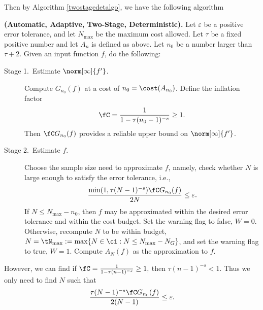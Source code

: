 Then by Algorithm \ref{twostagedetalgo}, we have the following algorithm
\begin{algo} \label{adpatalgo}
{\bf (Automatic, Adaptive, Two-Stage, Deterministic).}
 Let $\varepsilon$ be a positive error tolerance, and let $N_{\max}$ be the maximum cost allowed.  Let $\tau$ be a fixed positive number and
 let $A_{n}$ is defined as above. Let $n_{0}$ be a number larger than $\tau+2.$ Given an input function $f$, do the following:

\begin{description}
\item[Stage 1.\ Estimate {$\norm[\infty]{f'}$}.] Compute $G_{n_{0}}(f)$ at a cost of $n_{0} = \cost(A_{n_{0}})$.   Define the inflation factor
$$
\fC =\frac{1}{1 - \tau (n_{0}-1)^{-s}} \ge 1.
$$
Then $\fC G_{n_{0}}(f)$ provides a reliable upper bound on $\norm[\infty]{f'}$.

\item [Stage 2.\ Estimate {$f$}.] Choose the sample size need to approximate $f$, namely, check whether $N$ is large enough to satisfy the error tolerance, i.e.,
\[
\frac{\min(1,\tau (N-1)^{-s})\fC G_{n_{0}}(f)}{2N} \le \varepsilon.
\]
If $N \le N_{\max}-n_0$, then $f$ may be approximated within the desired error tolerance and within the cost budget.  Set the warning flag to false, $W=0$. Otherwise, recompute $N$ to be within budget, $N = \tN_{\max} := \max\{N \in \ci : N\le N_{\max} -  N_G\}$, and set the warning flag to true, $W=1$.  Compute $A_N(f)$ as the approximation to $f$.

\end{description}

\end{algo}

However, we can find if $\fC =\frac{1}{1 - \tau (n-1)^{-s}} \ge 1,$ then $\tau (n-1)^{-s} <1.$
Thus we only need to find $N$ such that  \[
\frac{\tau (N-1)^{-s}\fC G_{n_{0}}(f)}{2(N-1)} \le \varepsilon.
\]

